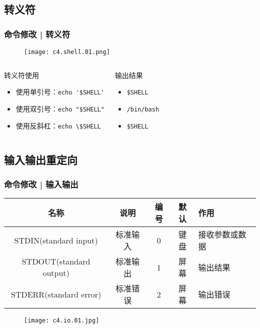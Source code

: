 \subsection{转义符}
\begin{frame}[fragile]
  \frametitle{命令修改 | \alert{转义符}}
  \begin{figure}
    \centering
    \texttt{[image: c4.shell.01.png]}
  \end{figure}
  \pause
  \begin{columns}
  \begin{block}{转义符使用}
    \begin{itemize}
      \item 使用单引号：\verb|echo '$SHELL'|
      \item 使用双引号：\verb|echo "$SHELL"|
      \item 使用反斜杠：\verb|echo \$SHELL|
    \end{itemize}
  \end{block}
    \pause
    \pause
    \begin{block}{输出结果}
      \begin{itemize}
        \item \verb|$SHELL|
        \item \verb|/bin/bash|
        \item \verb|$SHELL|
      \end{itemize}
    \end{block}
  \end{columns}
\end{frame}

\subsection{输入输出重定向}
\begin{frame}
  \frametitle{命令修改 | \alert{输入输出}}
  \begin{table}
    \centering
    \begin{tabular}{ccccl}
      \hline
      \rowcolor{blue!50}名称 & 说明 & 编号 & 默认 & 作用\\
      \hline
      STDIN(standard input) & 标准输入 & 0 & 键盘 & 接收参数或数据\\
      STDOUT(standard output) & 标准输出 & 1 & 屏幕 & 输出结果\\
      STDERR(standard error) & 标准错误 & 2 & 屏幕 & 输出错误\\
      \hline
    \end{tabular}
  \end{table}
  \begin{figure}
    \centering
    \texttt{[image: c4.io.01.jpg]}
  \end{figure}
\end{frame}


